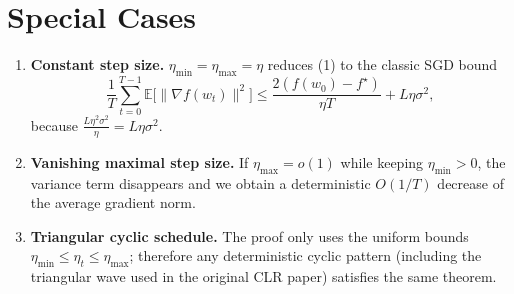 \documentclass[11pt]{article}
\newcommand{\E}{\mathbb{E}}
\begin{document}
\section*{Special Cases}
\begin{enumerate}
    \item \textbf{Constant step size.} $\eta_{\min}=\eta_{\max}=\eta$ reduces (1) to the classic SGD bound
    \[
    \frac{1}{T}\sum_{t=0}^{T-1}\E\!\big[\|\nabla f(w_{t})\|^{2}\big]
    \le \frac{2(f(w_{0})-f^{\star})}{\eta T}+L\eta\sigma^{2},
    \]
    because $\frac{L\eta^{2}\sigma^{2}}{\eta}=L\eta\sigma^{2}$.
    \item \textbf{Vanishing maximal step size.} If $\eta_{\max}=o(1)$ while keeping $\eta_{\min}>0$, the variance term disappears and we obtain a deterministic $O(1/T)$ decrease of the average gradient norm.
    \item \textbf{Triangular cyclic schedule.} The proof only uses the uniform bounds $\eta_{\min}\le\eta_{t}\le\eta_{\max}$; therefore any deterministic cyclic pattern (including the triangular wave used in the original CLR paper) satisfies the same theorem.
\end{enumerate}

\end{document}
